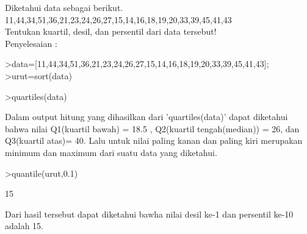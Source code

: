 \documentclass[a4paper,10pt]{article}
\begin{document}
\begin{eulernotebook}
\begin{eulercomment}
\begin{eulercomment}
\begin{eulercomment}
\begin{eulercomment}
\begin{eulercomment}
\begin{eulercomment}
\begin{eulercomment}
\end{eulercomment}
\begin{eulercomment}
Diketahui data sebagai berikut.\\
11,44,34,51,36,21,23,24,26,27,15,14,16,18,19,20,33,39,45,41,43\\
Tentukan kuartil, desil, dan persentil dari data tersebut!\\
Penyelesaian :
\end{eulercomment}
\begin{eulerprompt}
>data=[11,44,34,51,36,21,23,24,26,27,15,14,16,18,19,20,33,39,45,41,43];
>urut=sort(data)
\end{eulerprompt}
\begin{euleroutput}
  [11,  14,  15,  16,  18,  19,  20,  21,  23,  24,  26,  27,  33,  34,
  36,  39,  41,  43,  44,  45,  51]
\end{euleroutput}
\begin{eulerprompt}
>quartiles(data)
\end{eulerprompt}
\begin{euleroutput}
  [11,  18.5,  26,  40,  51]
\end{euleroutput}
\begin{eulercomment}
Dalam output hitung yang dihasilkan dari 'quartiles(data)' dapat
diketahui bahwa nilai Q1(kuartil bawah) = 18.5 , Q2(kuartil
tengah(median)) = 26, dan Q3(kuartil atas)= 40. Lalu untuk nilai
paling kanan dan paling kiri merupakan minimum dan maximum dari suatu
data yang diketahui.
\end{eulercomment}
\begin{eulerprompt}
>quantile(urut,0.1)
\end{eulerprompt}
\begin{euleroutput}
  15
\end{euleroutput}
\begin{eulercomment}
Dari hasil tersebut dapat diketahui bawha nilai desil ke-1 dan
persentil ke-10 adalah 15.


\end{eulercomment}
\end{eulercomment}
\end{eulercomment}
\end{eulercomment}
\end{eulercomment}
\end{eulercomment}
\end{eulercomment}
\end{eulernotebook}
\end{document}
